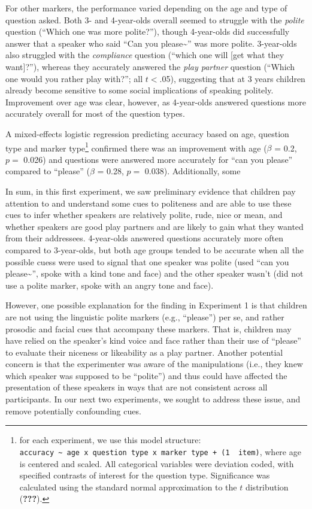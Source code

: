 \documentclass[10pt, letterpaper]{article}
\begin{document}
For other markers, the performance varied depending on the age and type
of question asked. Both 3- and 4-year-olds overall seemed to struggle
with the \emph{polite} question (``Which one was more polite?''), though
4-year-olds did successfully answer that a speaker who said ``Can you
please\textasciitilde{}'' was more polite. 3-year-olds also struggled
with the \emph{compliance} question (``which one will {[}get what they
want{]}?''), whereas they accurately answered the \emph{play partner}
question (``Which one would you rather play with?''; all \(t<\).05),
suggesting that at 3 years children already become sensitive to some
social implications of speaking politely. Improvement over age was
clear, however, as 4-year-olds answered questions more accurately
overall for most of the question types.

A mixed-effects logistic regression predicting accuracy based on age,
question type and marker type\footnote{for each experiment, we use this
  model structure:
  \texttt{accuracy\ \textasciitilde{}\ age\ x\ question\ type\ x\ marker\ type\ +\ (1\ \textbar{}\ item)},
  where age is centered and scaled. All categorical variables were
  deviation coded, with specified contrasts of interest for the question
  type. Significance was calculated using the standard normal
  approximation to the \(t\) distribution ({\textbf{???}}).} confirmed
there was an improvement with age (\(\beta\) = 0.2, \(p =\) 0.026) and
questions were answered more accurately for ``can you please'' compared
to ``please'' (\(\beta\) = 0.28, \(p =\) 0.038). Additionally, some

In sum, in this first experiment, we saw preliminary evidence that
children pay attention to and understand some cues to politeness and are
able to use these cues to infer whether speakers are relatively polite,
rude, nice or mean, and whether speakers are good play partners and are
likely to gain what they wanted from their addressees. 4-year-olds
answered questions accurately more often compared to 3-year-olds, but
both age groups tended to be accurate when all the possible cuess were
used to signal that one speaker was polite (used ``can you
please\textasciitilde{}'', spoke with a kind tone and face) and the
other speaker wasn't (did not use a polite marker, spoke with an angry
tone and face).

However, one possible explanation for the finding in Experiment 1 is
that children are not using the linguistic polite markers (e.g.,
``please'') per se, and rather prosodic and facial cues that accompany
these markers. That is, children may have relied on the speaker's kind
voice and face rather than their use of ``please'' to evaluate their
niceness or likeability as a play partner. Another potential concern is
that the experimenter was aware of the manipulations (i.e., they knew
which speaker was supposed to be ``polite'') and thus could have
affected the presentation of these speakers in ways that are not
consistent across all participants. In our next two experiments, we
sought to address these issue, and remove potentially confounding cues.
\end{document}
